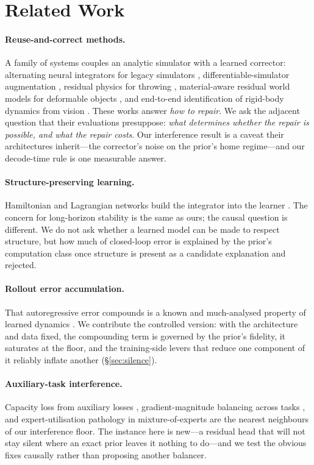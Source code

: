 \documentclass{article}
\begin{document}
\section{Related Work}

\paragraph{Reuse-and-correct methods.} A family of systems couples an analytic simulator with a learned corrector: alternating neural integrators for legacy simulators \citep{ani2026}, differentiable-simulator augmentation \citep{neuralsim2021}, residual physics for throwing \citep{tossingbot2019}, material-aware residual world models for deformable objects \citep{physcore2026}, and end-to-end identification of rigid-body dynamics from vision \citep{pinwm2025}. These works answer \emph{how to repair}. We ask the adjacent question that their evaluations presuppose: \emph{what determines whether the repair is possible, and what the repair costs}. Our interference result is a caveat their architectures inherit---the corrector's noise on the prior's home regime---and our decode-time rule is one measurable answer.

\paragraph{Structure-preserving learning.} Hamiltonian and Lagrangian networks build the integrator into the learner \citep{hgn2019,chnn2020,se3hode2021}. The concern for long-horizon stability is the same as ours; the causal question is different. We do not ask whether a learned model can be made to respect structure, but how much of closed-loop error is explained by the prior's computation class once structure is present as a candidate explanation and rejected.

\paragraph{Rollout error accumulation.} That autoregressive error compounds is a known and much-analysed property of learned dynamics \citep{pderefiner,mbpo2019,swazinna2021}. We contribute the controlled version: with the architecture and data fixed, the compounding term is governed by the prior's fidelity, it saturates at the floor, and the training-side levers that reduce one component of it reliably inflate another (\S\ref{sec:silence}).

\paragraph{Auxiliary-task interference.} Capacity loss from auxiliary losses \citep{lyle2021}, gradient-magnitude balancing across tasks \citep{metabalance2022}, and expert-utilisation pathology in mixture-of-experts \citep{deepseekv3,auxlossfree2024} are the nearest neighbours of our interference floor. The instance here is new---a residual head that will not stay silent where an exact prior leaves it nothing to do---and we test the obvious fixes causally rather than proposing another balancer.
\end{document}
